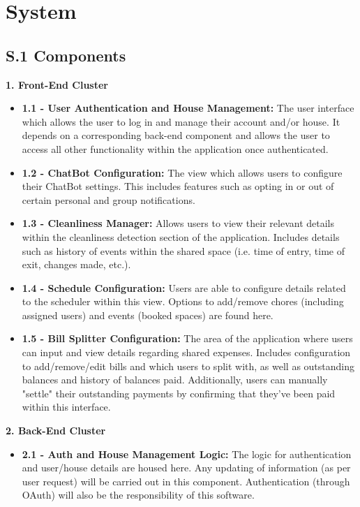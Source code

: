 \documentclass{scrreprt}
\newcommand*{\nsection}[1]{
    \section*{#1}
    \addcontentsline{toc}{section}{#1}
}
\theoremstyle{definition}
\begin{document}
\chapter*{System}
\minitoc%

\nsection{S.1 Components}

\begin{flushleft}
  \item \textbf{1. Front-End Cluster}
  \begin{itemize}
  	\item \textbf{1.1 - User Authentication and House Management:} The user interface which allows the user to log in and manage their account and/or house. It depends on a corresponding back-end component and allows the user to access all other functionality within the application once authenticated.
  	\item \textbf{1.2 - ChatBot Configuration:} The view which allows users to configure their ChatBot settings. This includes features such as opting in or out of certain personal and group notifications.
  	\item \textbf{1.3 - Cleanliness Manager:} Allows users to view their relevant details within the cleanliness detection section of the application. Includes details such as history of events within the shared space (i.e. time of entry, time of exit, changes made, etc.).
  	\item \textbf{1.4 - Schedule Configuration:} Users are able to configure details related to the scheduler within this view. Options to add/remove chores (including assigned users) and events (booked spaces) are found here.
  	\item \textbf{1.5 - Bill Splitter Configuration:} The area of the application where users can input and view details regarding shared expenses. Includes configuration to add/remove/edit bills and which users to split with, as well as outstanding balances and history of balances paid. Additionally, users can manually "settle" their outstanding payments by confirming that they've been paid within this interface.
  	\end{itemize}
  \item \textbf{2. Back-End Cluster}
   \begin{itemize}
   \item \textbf{2.1 - Auth and House Management Logic:} The logic for authentication and user/house details are housed here. Any updating of information (as per user request) will be carried out in this component. Authentication (through OAuth) will also be the responsibility of this software.

\end{itemize}
\end{flushleft}
\end{document}
